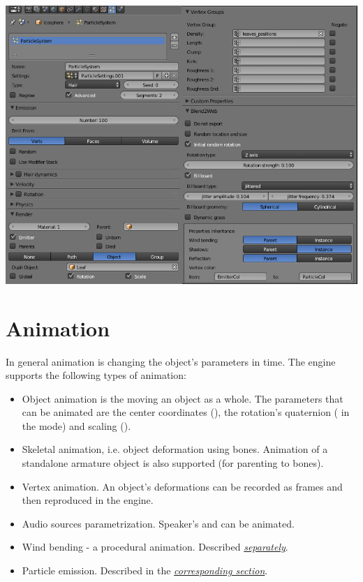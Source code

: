 \documentclass[a4paper,12pt,oneside]{sphinxmanual}
\begin{document}
{\hfill\includegraphics[width=1.000\linewidth]{particle_settings.jpg}\hfill}
\label{animation:animation}

\chapter{Animation}
\label{animation:index-0}\label{animation::doc}\label{animation:id1}
In general animation is changing the object's parameters in time. The engine supports the following types of animation:
\begin{itemize}
\item {} 
Object animation is the moving an object as a whole. The parameters that can be animated are the center coordinates (), the rotation's quaternion ( in the  mode) and scaling ().

\item {} 
Skeletal animation, i.e. object deformation using bones. Animation of a standalone armature object is also supported (for parenting to bones).

\item {} 
Vertex animation. An object's deformations can be recorded as frames and then reproduced in the engine.

\item {} 
Audio sources parametrization. Speaker's  and  can be animated.

\item {} 
Wind bending - a procedural animation. Described {\hyperref[outdoor_rendering:wind]{\emph{separately}}}.

\item {} 
Particle emission. Described in the {\hyperref[particles:particles]{\emph{corresponding section}}}.

\end{itemize}
\end{document}
